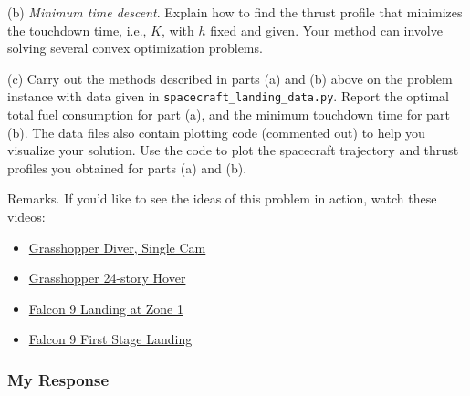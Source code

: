 \documentclass[12pt,reqno]{article}
\theoremstyle{definition}
\numberwithin{equation}{section}
\begin{document}
    \vspace{0.2cm}
    \noindent(b) \textit{Minimum time descent}. Explain how to find the thrust profile that minimizes the touchdown time, i.e., $K$, with $h$ fixed and given.
    Your method can involve solving several convex optimization problems.

    \vspace{0.2cm}
    \noindent(c) Carry out the methods described in parts (a) and (b) above on the problem instance with data given in \lstinline|spacecraft_landing_data.py|.
    Report the optimal total fuel consumption for part (a), and the minimum touchdown time for part (b). The data files also contain plotting code (commented out) to help you visualize your solution. Use the code to plot the spacecraft trajectory and thrust profiles you obtained for parts (a) and (b).
    
    \vspace{0.2cm}
    \noindent Remarks. If you'd like to see the ideas of this problem in action, watch these videos:
    \begin{itemize}
        \item \href{http://www.youtube.com/watch?v=2t15vP1PyoA}{Grasshopper Diver, Single Cam}
        \item \href{https://www.youtube.com/watch?v=orUjSkc2pG0}{Grasshopper 24-story Hover}
        \item \href{https://www.youtube.com/watch?v=1B6oiLNyKKI}{Falcon 9 Landing at Zone 1}
        \item \href{https://www.youtube.com/watch?v=ZCBE8ocOkAQ}{Falcon 9 First Stage Landing}
    \end{itemize}

\subsubsection*{My Response}
    
\end{document}
